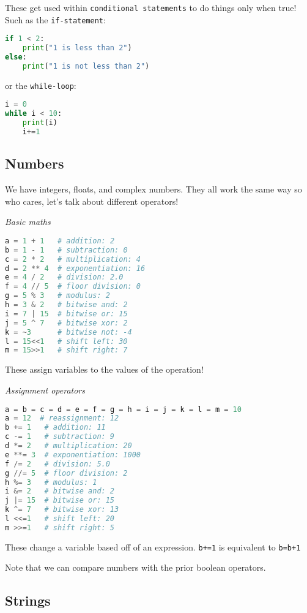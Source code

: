 \documentclass[12pt, twoside, reqno]{book}
\begin{document}
These get used within \texttt{conditional statements} to do things only when true! Such as the \texttt{if-statement}:
\begin{lstlisting}[language=Python]
if 1 < 2:
    print("1 is less than 2")
else:
    print("1 is not less than 2")
\end{lstlisting}

or the \texttt{while-loop}:
\begin{lstlisting}[language=Python]
i = 0
while i < 10:
    print(i)
    i+=1
\end{lstlisting}

\subsection{Numbers}

We have integers, floats, and complex numbers. They all work the same way so who cares, let's talk about different operators!

\textit{Basic maths}
\begin{lstlisting}[language=Python]
a = 1 + 1   # addition: 2
b = 1 - 1   # subtraction: 0
c = 2 * 2   # multiplication: 4
d = 2 ** 4  # exponentiation: 16
e = 4 / 2   # division: 2.0
f = 4 // 5  # floor division: 0
g = 5 % 3   # modulus: 2
h = 3 & 2   # bitwise and: 2
i = 7 | 15  # bitwise or: 15
j = 5 ^ 7   # bitwise xor: 2
k = ~3      # bitwise not: -4
l = 15<<1   # shift left: 30
m = 15>>1   # shift right: 7
\end{lstlisting}

These assign variables to the values of the operation!

\textit{Assignment operators}
\begin{lstlisting}[language=Python]
a = b = c = d = e = f = g = h = i = j = k = l = m = 10
a = 12  # reassignment: 12
b += 1   # addition: 11
c -= 1   # subtraction: 9
d *= 2   # multiplication: 20
e **= 3  # exponentiation: 1000
f /= 2   # division: 5.0
g //= 5  # floor division: 2
h %= 3   # modulus: 1
i &= 2   # bitwise and: 2
j |= 15  # bitwise or: 15
k ^= 7   # bitwise xor: 13
l <<=1   # shift left: 20
m >>=1   # shift right: 5
\end{lstlisting}

These change a variable based off of an expression. \texttt{b+=1} is equivalent to \texttt{b=b+1}

Note that we can compare numbers with the prior boolean operators.

\subsection{Strings}
\end{document}
